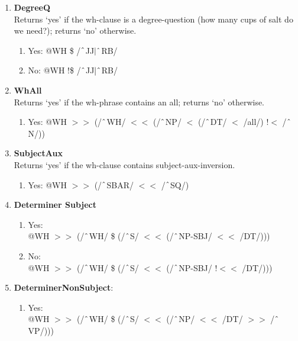 \begin{enumerate}
    \item \textbf{DegreeQ}\\
    Returns `yes' if the wh-clause is a degree-question (\textsf{how many cups of salt do we need?}); returns `no' otherwise.
        \begin{enumerate}
            \item Yes: @WH \$ /$\string^$JJ$|\string^$RB/
            \item No: @WH !\$ /$\string^$JJ$|\string^$RB/
        \end{enumerate}
    \item \textbf{WhAll}\\
    Returns `yes' if the wh-phrase contains an \textsf{all}; returns `no' otherwise.
        \begin{enumerate}
            \item Yes: @WH $>\!\!>$ (/$\string^$WH/ $<\!\!<$ (/$\string^$NP/ $<$ (/$\string^$DT/ $<$ /all/) !$<$ /$\string^$N/))
        \end{enumerate}
    \item \textbf{SubjectAux}\\
    Returns `yes' if the wh-clause contains subject-aux-inversion.
        \begin{enumerate}
            \item Yes: @WH $>\!\!>$ (/$\string^$SBAR/ $<\!\!<$ /$\string^$SQ/)
        \end{enumerate}
    \item \textbf{Determiner Subject}
        \begin{enumerate}
            \item Yes: \\
            @WH $>\!\!>$ (/$\string^$WH/ \$ (/$\string^$S/ $<\!\!<$ (/$\string^$NP-SBJ/ $<\!\!<$ /DT/)))
            \item No: \\
            @WH $>\!\!>$ (/$\string^$WH/ \$ (/$\string^$S/ $<\!\!<$ (/$\string^$NP-SBJ/ !$<\!\!<$ /DT/)))
        \end{enumerate}
    \item \textbf{DeterminerNonSubject}:
        \begin{enumerate}
            \item Yes: \\
            @WH $>\!\!>$ (/$\string^$WH/ \$ (/$\string^$S/ $<\!\!<$ (/$\string^$NP/ $<\!\!<$ /DT/ $>\!\!>$ /$\string^$VP/)))


\end{enumerate}
\end{enumerate}
